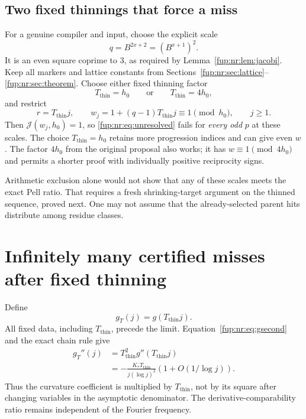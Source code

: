 \documentclass[11pt,letterpaper]{article}
\theoremstyle{definition}\newtheorem{definition}[theorem]{Definition}
\theoremstyle{remark}\newtheorem{remark}[theorem]{Remark}
\begin{document}
\subsection{Two fixed thinnings that force a miss}
For a genuine compiler and input, choose the explicit scale
\[
 q=B^{2x+2}=(B^{x+1})^2.
\]
It is an even square coprime to $3$, as required by Lemma~\ref{fup:nr:lem:jacobi}. Keep all markers and lattice constants from Sections~\ref{fup:nr:sec:lattice}--\ref{fup:nr:sec:theorem}. Choose either fixed thinning factor
\begin{equation}\label{fup:nr:eq:thinfactor}
 T_{\mathrm{thin}}=h_0\qquad\text{or}\qquad T_{\mathrm{thin}}=4h_0,
\end{equation}
and restrict
\begin{equation}\label{fup:nr:eq:thinprogression}
 r=T_{\mathrm{thin}}j,\qquad
 w_j=1+(q-1)T_{\mathrm{thin}}j\equiv1\pmod{h_0},\qquad j\ge1.
\end{equation}
Then $\mathcal J(w_j,h_0)=1$, so \eqref{fup:nr:eq:unresolved} fails for \emph{every odd} $p$ at these scales. The choice $T_{\mathrm{thin}}=h_0$ retains more progression indices and can give even $w$. The factor $4h_0$ from the original proposal also works; it has $w\equiv1\pmod{4h_0}$ and permits a shorter proof with individually positive reciprocity signs.

Arithmetic exclusion alone would not show that any of these scales meets the exact Pell ratio. That requires a fresh shrinking-target argument on the thinned sequence, proved next. One may not assume that the already-selected parent hits distribute among residue classes.

\section{Infinitely many certified misses after fixed thinning}\label{fup:nr:sec:misses}
Define
\[
 g_T(j)=g(T_{\mathrm{thin}}j).
\]
All fixed data, including $T_{\mathrm{thin}}$, precede the limit. Equation~\eqref{fup:nr:eq:gsecond} and the exact chain rule give
\begin{align}\label{fup:nr:eq:thinsecond}
 g_T''(j)&=T_{\mathrm{thin}}^2g''(T_{\mathrm{thin}}j)\nonumber\\
 &=-\frac{K_*T_{\mathrm{thin}}}{j(\log j)^2}
       \left(1+O(1/\log j)\right).
\end{align}
Thus the curvature coefficient is multiplied by $T_{\mathrm{thin}}$, not by its square after changing variables in the asymptotic denominator. The derivative-comparability ratio remains independent of the Fourier frequency.
\end{document}
